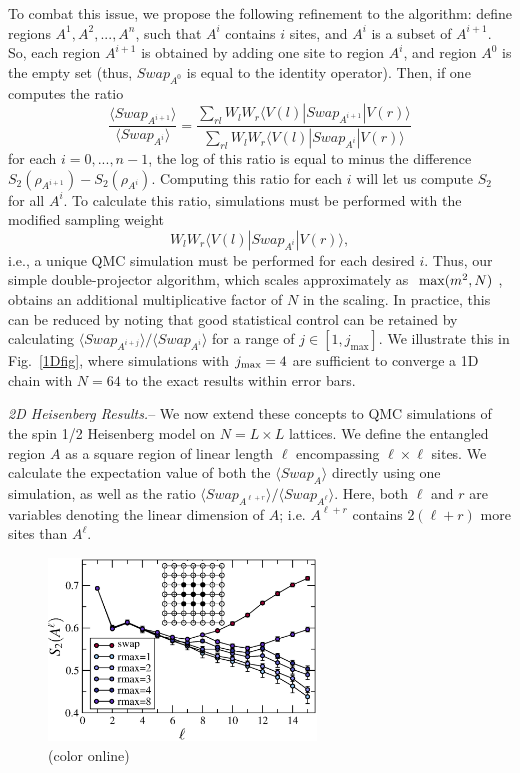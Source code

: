 \documentclass[prl,aps,twocolumn,floatfix,amsmath,amssymb,superscriptaddress,tightenlines]{revtex4}
\begin{document}
To combat this issue, we propose the following refinement to the algorithm: define regions $A^1,A^2,...,A^n$, such
that $A^i$ contains $i$ sites, and $A^i$ is a subset of $A^{i+1}$.  So, each region $A^{i+1}$ is obtained by adding one site to region
$A^{i}$, and region $A^0$ is the empty set (thus, $Swap_{A^0}$ is equal to the identity operator).
Then, if one computes the ratio
\begin{equation}
\frac{\langle Swap_{A^{i+1}}\rangle}{\langle Swap_{A^{i}}\rangle}
= \frac{\sum_{rl} W_l W_r \langle V(l) | Swap_{A^{i+1}} | V(r) \rangle} {\sum_{rl} W_l W_r \langle V(l) | Swap_{A^i} | V(r) \rangle}
\end{equation}
for each $i=0,...,n-1$, the log of this ratio is equal to minus the
difference $S_2(\rho_{A^{i+1}})-S_2(\rho_{A^{i}})$.
Computing this ratio for each $i$ will let us compute $S_2$ for all $A^i$.  To calculate this ratio, simulations must be performed 
with the modified sampling weight
\begin{equation}
W_l W_r \langle V(l) | Swap_{A^i} | V(r) \rangle,
\end{equation}
i.e., a unique QMC simulation must be performed for each desired $i$.  Thus, our simple double-projector algorithm, which scales 
approximately as $~{\rm max}(m^2, N)$ \cite{AWSloop}, obtains an additional multiplicative factor of $N$ in the scaling.  In practice, 
this can be reduced by noting that good statistical control can be retained by calculating 
${\langle Swap_{A^{i+j}}\rangle}/{\langle Swap_{A^{i}}\rangle}$ for a range of $j \in [1,j_{\max}]$.  We illustrate this in Fig.~\ref{1Dfig},
where simulations with $j_{\rm max}=4$ are sufficient to converge a 1D chain with $N=64$ to the exact results within error bars.

{\it 2D Heisenberg Results.}-- We now extend these concepts to QMC simulations of the spin 1/2 Heisenberg model on $N=L \times L$ lattices.  We define the entangled region $A$ as a square region of linear length $\ell$ encompassing $\ell \times \ell$ sites.  We calculate the expectation value of both the $\langle Swap_A \rangle$ directly using one simulation, as well as the ratio ${\langle Swap_{A^{\ell+r}}\rangle}/{\langle Swap_{A^{\ell}}\rangle}$.  Here, both $\ell$ and $r$ are variables denoting the linear dimension of $A$; i.e. $A^{\ell+r}$ contains $2(\ell+r)$ more sites than $A^{\ell}$.

\begin{figure} {
\includegraphics[width=2.8in]{L16_ratio.eps} \caption{(color online) 
\label{L16fig}
}
} \end{figure}
\end{document}
